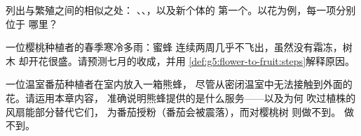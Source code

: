 \begin{exercise}[$\star\star$]\label{exo:g5:flower-to-fruit:9}
列出与繁殖之间的相似之处：
、、，以及新个体的
第一个。以花为例，每一项分别位于
哪里？
\end{exercise}

\begin{exercise}[$\star\star$]\label{exo:g5:flower-to-fruit:10}
一位樱桃种植者的春季寒冷多雨：蜜蜂
连续两周几乎不飞出，虽然没有霜冻，树木
却开花很盛。请预测七月的收成，并用
\cref{def:g5:flower-to-fruit:steps}解释原因。
\end{exercise}

\begin{exercise}[$\star\star\star$]\label{exo:g5:flower-to-fruit:11}
一位温室番茄种植者在室内放入一箱熊蜂，
尽管从密闭温室中无法接触到外面的花。请运用本章内容，
准确说明熊蜂提供的是什么服务——以及为何
吹过植株的风扇能部分替代它们，
为番茄授粉（番茄会被震落），而对樱桃树
则做不到。
做不到。
\end{exercise}
